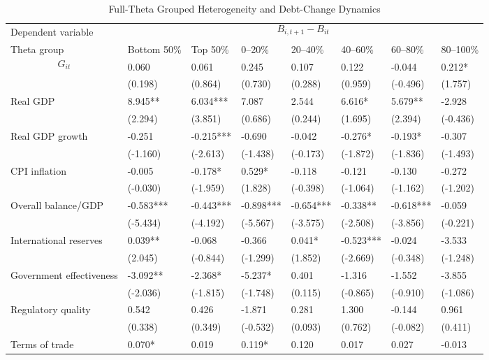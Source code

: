 \begin{table}[H]\centering
\begin{threeparttable}
\caption{Full-Theta Grouped Heterogeneity and Debt-Change Dynamics}
\label{tab:theta_group_heterogeneity_debt}
\scriptsize
\begin{tabularx}{\textwidth}{lYYYYYYY}
\toprule
Dependent variable &  \\
\cmidrule(lr){2-8}
Theta group & Bottom 50\% & Top 50\% & 0--20\% & 20--40\% & 40--60\% & 60--80\% & 80--100\% \\
\midrule
$$G_{it}$$ & 0.060 & 0.061 & 0.245 & 0.107 & 0.122 & -0.044 & 0.212* \\
  & (0.198) & (0.864) & (0.730) & (0.288) & (0.959) & (-0.496) & (1.757) \\
Real GDP & 8.945** & 6.034*** & 7.087 & 2.544 & 6.616* & 5.679** & -2.928 \\
  & (2.294) & (3.851) & (0.686) & (0.244) & (1.695) & (2.394) & (-0.436) \\
Real GDP growth & -0.251 & -0.215*** & -0.690 & -0.042 & -0.276* & -0.193* & -0.307 \\
  & (-1.160) & (-2.613) & (-1.438) & (-0.173) & (-1.872) & (-1.836) & (-1.493) \\
CPI inflation & -0.005 & -0.178* & 0.529* & -0.118 & -0.121 & -0.130 & -0.272 \\
  & (-0.030) & (-1.959) & (1.828) & (-0.398) & (-1.064) & (-1.162) & (-1.202) \\
Overall balance/GDP & -0.583*** & -0.443*** & -0.898*** & -0.654*** & -0.338** & -0.618*** & -0.059 \\
  & (-5.434) & (-4.192) & (-5.567) & (-3.575) & (-2.508) & (-3.856) & (-0.221) \\
International reserves & 0.039** & -0.068 & -0.366 & 0.041* & -0.523*** & -0.024 & -3.533 \\
  & (2.045) & (-0.844) & (-1.299) & (1.852) & (-2.669) & (-0.348) & (-1.248) \\
Government effectiveness & -3.092** & -2.368* & -5.237* & 0.401 & -1.316 & -1.552 & -3.855 \\
  & (-2.036) & (-1.815) & (-1.748) & (0.115) & (-0.865) & (-0.910) & (-1.086) \\
Regulatory quality & 0.542 & 0.426 & -1.871 & 0.281 & 1.300 & -0.144 & 0.961 \\
  & (0.338) & (0.349) & (-0.532) & (0.093) & (0.762) & (-0.082) & (0.411) \\
Terms of trade & 0.070* & 0.019 & 0.119* & 0.120 & 0.017 & 0.027 & -0.013 \\

\end{tabularx}
\end{threeparttable}
\end{table}
